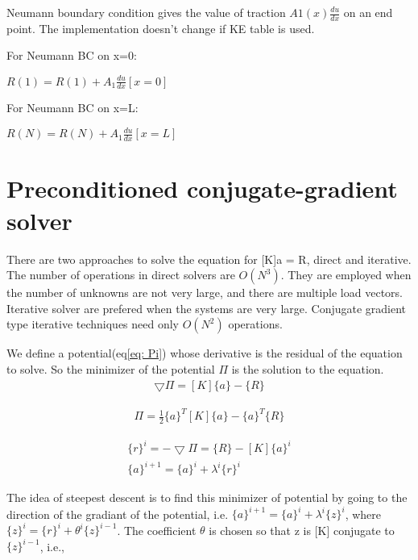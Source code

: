 \documentclass[paper=a4, fontsize=11pt]{article} %
\begin{document}
Neumann boundary condition gives the value of traction $A1(x)\frac{du}{dx}$ on an end point. The implementation doesn't change if KE table is used.

For Neumann BC on x=0:

 $R(1) = R(1) + A_1 \frac{du}{dx}[x=0] $


For Neumann BC on x=L:

 $R(N)=R(N)+ A_1 \frac{du}{dx}[x=L] $
\section{Preconditioned conjugate-gradient solver}

There are two approaches to solve the equation for [K]{a} = {R}, direct and iterative. The number of operations in direct solvers are  $O(N^3)$. They are employed when the number of unknowns are not very large, and there are multiple load vectors. Iterative solver are prefered when the systems are very large. Conjugate gradient type iterative techniques need only $O(N^2)$ operations. 

We define a potential(eq\ref{eq: Pi}) whose derivative is the residual of the equation to solve. So the minimizer of the potential $\Pi$ is the solution to the equation. 
\begin{eqnarray}
\bigtriangledown \Pi = [K]\{a\} - \{R\}
\end{eqnarray}

\begin{eqnarray}
\label{eq: Pi}
\Pi = \frac{1}{2} \{a\}^T [K] \{a\} - \{a\}^T\{R\}
\end{eqnarray}

\begin{eqnarray}
\label{eq: residual}
\{r\}^i = - \bigtriangledown \Pi = \{R\} - [K] \{a\}^i \nonumber\\
\{a\}^{i+1} = \{a\}^i + \lambda^i \{r\}^i
\end{eqnarray}

The idea of steepest descent is to find this minimizer of potential by going to the direction of the gradiant of the potential, i.e. $\{a\} ^{i+1} = \{a\} ^i + \lambda ^i \{z\} ^i $, where $\{z\}^i = \{r\}^i + \theta ^i\{z\}^{i-1}$. The coefficient $\theta$ is chosen so that {z} is [K] conjugate to $\{z\}^{i-1}$, i.e.,
\end{document}
